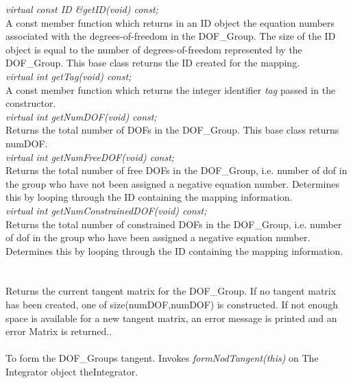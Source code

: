 {\em virtual const ID \&getID(void) const;} \\
A const member function which returns in an ID object the equation
numbers associated with the degrees-of-freedom in the DOF\_Group. The
size of the ID object is equal to the number of degrees-of-freedom
represented by the DOF\_Group. This base class returns the ID created
for the mapping.\\ 

{\em virtual int getTag(void) const;} \\
A const member function which returns the integer identifier {\em
tag} passed in the constructor. \\

{\em virtual int getNumDOF(void) const;}\\
Returns the total number of DOFs in the DOF\_Group. This base class
returns \p numDOF.\\

{\em virtual int getNumFreeDOF(void) const;}\\
Returns the total number of \p free DOFs in the DOF\_Group,
i.e. number of dof in the group who have not been assigned a negative
equation number. Determines this by looping through the ID containing
the mapping information. \\

{\em virtual int getNumConstrainedDOF(void) const;}\\
Returns the total number of \p constrained DOFs in the DOF\_Group,
i.e. number of dof in the group who have been assigned a negative
equation number. Determines this by looping through the ID containing
the mapping information. \\


  \\ 
 \\
Returns the current tangent matrix for the DOF\_Group. If no tangent
matrix has been created, one of size(numDOF,numDOF) is constructed.
If not enough space is available for a new tangent matrix, an error
message is printed and an error Matrix is returned.. \\  

 \\
To form the DOF\_Groups tangent. Invokes {\em formNodTangent(this)} on
The Integrator object \p theIntegrator. \\

